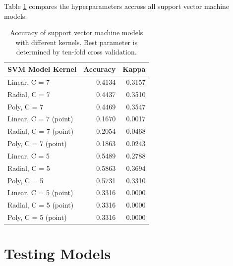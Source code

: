 \documentclass[12pt,twoside]{reedthesis}
\begin{document}
Table \ref{tab:resultsSVM} compares the hyperparameters accross all support vector machine models.
\begin{table}

\caption{\label{tab:resultsSVM}Accuracy of support vector machine models with different kernels. Best parameter is determined by ten-fold cross validation.}
\centering
\begin{tabular}[t]{l|r|r}
\hline
SVM Model Kernel & Accuracy & Kappa\\
\hline
Linear, C = 7 & 0.4134 & 0.3157\\
\hline
Radial, C = 7 & 0.4437 & 0.3510\\
\hline
Poly, C = 7 & 0.4469 & 0.3547\\
\hline
Linear, C = 7 (point) & 0.1670 & 0.0017\\
\hline
Radial, C = 7 (point) & 0.2054 & 0.0468\\
\hline
Poly, C = 7 (point) & 0.1863 & 0.0243\\
\hline
Linear, C = 5 & 0.5489 & 0.2788\\
\hline
Radial, C = 5 & 0.5863 & 0.3694\\
\hline
Poly, C = 5 & 0.5731 & 0.3310\\
\hline
Linear, C = 5 (point) & 0.3316 & 0.0000\\
\hline
Radial, C = 5 (point) & 0.3316 & 0.0000\\
\hline
Poly, C = 5 (point) & 0.3316 & 0.0000\\
\hline
\end{tabular}
\end{table}
\hypertarget{testing-models}{%
\section{Testing Models}\label{testing-models}}
\end{document}
